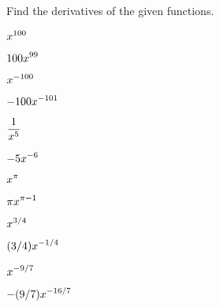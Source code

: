 \begin{exercises}

Find the derivatives of the given functions.

\twocol

\exercise $\displaystyle x^{100}$
\begin{answer} $\displaystyle 100x^{99}$
\end{answer}

\exercise $\displaystyle x^{-100}$
\begin{answer} $\displaystyle -100x^{-101}$
\end{answer}

\exercise $\displaystyle {1\over x^5}$
\begin{answer} $\displaystyle -5x^{-6}$
\end{answer}

\exercise $\displaystyle x^\pi$
\begin{answer} $\displaystyle \pi x^{\pi-1}$
\end{answer}

\exercise $\displaystyle x^{3/4}$
\begin{answer} $\displaystyle (3/4)x^{-1/4}$
\end{answer}

\exercise $\displaystyle x^{-9/7}$
\begin{answer} $\displaystyle -(9/7)x^{-16/7}$
\end{answer}

\endtwocol

\end{exercises}
